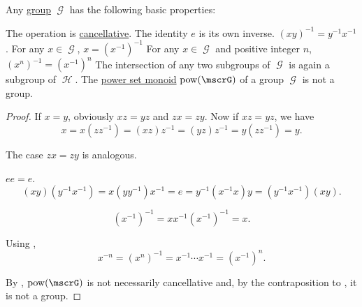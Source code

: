 \begin{proposition}\label{thm:group_properties}
  Any \hyperref[def:group]{group} \( \mscrG \) has the following basic properties:
  \begin{thmenum}
     The operation is \hyperref[def:magma/cancellative]{cancellative}.
     The identity \( e \) is its own inverse.
     \( (xy)^{-1} = y^{-1} x^{-1} \).
     For any \( x \in \mscrG \), \( x = (x^{-1})^{-1} \)
     For any \( x \in \mscrG \) and positive integer \( n \), \( (x^n)^{-1} = (x^{-1})^n \)
     The intersection of any two subgroups of \( \mscrG \) is again a subgroup of \( \mscrH \).
     The \hyperref[def:magma/power_set]{power set monoid} \( \pow(\mscrG) \) of a group \( \mscrG \) is not a group.
  \end{thmenum}
\end{proposition}
\begin{proof}
   If \( x = y \), obviously \( xz = yz \) and \( zx = zy \). Now if \( xz = yz \), we have
  \begin{equation*}
    x = x(zz^{-1}) = (xz)z^{-1} = (yz)z^{-1} = y(zz^{-1}) = y.
  \end{equation*}

  The case \( zx = zy \) is analogous.

   \( ee = e \).
  \begin{equation*}
    (xy) (y^{-1} x^{-1})
    =
    x (y y^{-1}) x^{-1}
    =
    e
    =
    y^{-1} (x^{-1} x) y
    =
    (y^{-1} x^{-1}) (xy).
  \end{equation*}

  \begin{equation*}
    (x^{-1})^{-1}
    =
    x x^{-1} (x^{-1})^{-1}
    =
    x.
  \end{equation*}

   Using ,
  \begin{equation*}
    x^{-n}
    =
    (x^n)^{-1}
    =
    x^{-1} \cdots x^{-1}
    =
    (x^{-1})^n.
  \end{equation*}

   By , \( \pow(\mscrG) \) is not necessarily cancellative and, by the contraposition to , it is not a group.
\end{proof}

